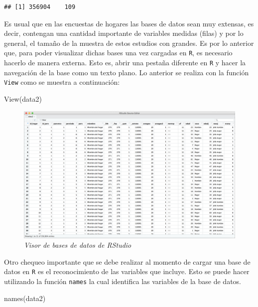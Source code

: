 \documentclass[
  12pt,
]{book}
\newenvironment{Shaded}{\begin{snugshade}}{\end{snugshade}}
\newcommand{\FunctionTok}[1]{\textcolor[rgb]{0.00,0.00,0.00}{#1}}
\newcommand{\NormalTok}[1]{#1}
\begin{document}
\begin{verbatim}
## [1] 356904    109
\end{verbatim}

Es usual que en las encuestas de hogares las bases de datos sean muy extensas, es decir, contengan una cantidad importante de variables medidas (filas) y por lo general, el tamaño de la muestra de estos estudios con grandes. Es por lo anterior que, para poder visualizar dichas bases una vez cargadas en \texttt{R}, es necesario hacerlo de manera externa. Esto es, abrir una pestaña diferente en \texttt{R} y hacer la navegación de la base como un texto plano. Lo anterior se realiza con la función \texttt{View} como se muestra a continuación:

\begin{Shaded}
\begin{Highlighting}[]
\FunctionTok{View}\NormalTok{(data2)}
\end{Highlighting}
\end{Shaded}

\begin{figure}
\centering
\includegraphics[width=8.85417in,height=\textheight]{Imagenes/Cap 0/1.png}
\caption{\emph{Visor de bases de datos de RStudio}}
\end{figure}

Otro chequeo importante que se debe realizar al momento de cargar una base de datos en \texttt{R} es el reconocimiento de las variables que incluye. Esto se puede hacer utilizando la función \texttt{names} la cual identifica las variables de la base de datos.

\begin{Shaded}
\begin{Highlighting}[]
\FunctionTok{names}\NormalTok{(data2)}
\end{Highlighting}
\end{Shaded}
\end{document}
